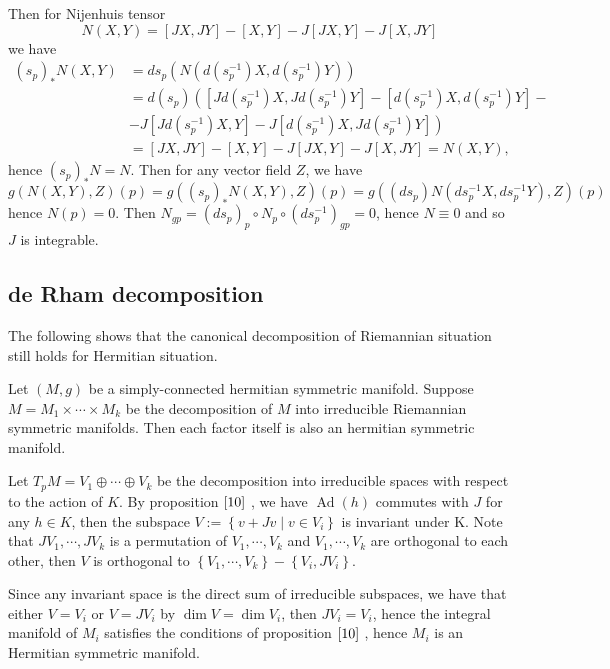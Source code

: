Then for Nijenhuis tensor
\[
N(X, Y)=[J X, J Y]-[X, Y]-J[J X, Y]-J[X, J Y]
\]
we have
\[
\begin{aligned}
	\left(s_{p}\right)_{*} N(X, Y) &=d
	s_{p}\left(N\left(d\left(s_{p}^{-1}\right) X,
	d\left(s_{p}^{-1}\right) Y\right)\right) \\
	&=d\left(s_{p}\right)\left(\left[J d\left(s_{p}^{-1}\right)
	X, J d\left(s_{p}^{-1}\right)
	Y\right]-\left[d\left(s_{p}^{-1}\right) X,
	d\left(s_{p}^{-1}\right) Y\right]-\right.\\
	&\left.-J\left[J d\left(s_{p}^{-1}\right) X,
	Y\right]-J\left[d\left(s_{p}^{-1}\right) X, J
	d\left(s_{p}^{-1}\right) Y\right]\right) \\
	&=[J X, J Y]-[X, Y]-J[J X, Y]-J[X, J Y]=N(X, Y),
\end{aligned}
\]
hence $\left(s_{p}\right)_{*} N=N$. Then for any vector field
$Z$, we have
\[
g(N(X, Y), Z)(p)=g\left(\left(s_{p}\right)_{*} N(X, Y),
Z\right)(p)=g\left(\left(d s_{p}\right) N\left(d s_{p}^{-1} X, d
s_{p}^{-1} Y\right), Z\right)(p)
\]
hence $N(p)=0$. Then $N_{g p}=\left(d s_{p}\right)_{p} \circ
N_{p} \circ\left(d s_{p}^{-1}\right)_{g p}=0$, hence $N \equiv 0$
and so $J$ is integrable.
\eproof
\subsection{de Rham decomposition}

The following shows that the canonical decomposition of
Riemannian situation still holds for Hermitian situation.

\begin{theorem}
Let $(M, g)$ be a simply-connected hermitian symmetric manifold.
Suppose $M=M_{1} \times \cdots \times M_{k}$ be the decomposition
of $M$ into irreducible Riemannian symmetric manifolds. Then each
factor itself is also an hermitian symmetric manifold.	
\end{theorem}
\bproof
Let $T_{p} M=V_{1} \oplus \cdots \oplus V_{k}$ be the
decomposition into irreducible spaces with respect to the action
of $K$. By proposition $\ref{10}$ , we have
$\operatorname{Ad}(h)$ commutes with $J$ for any $h \in K$, then
the subspace $V:=\left\{v+J v \mid v \in V_{i}\right\}$ is
invariant under
K. Note that $J V_{1}, \cdots, J V_{k}$ is a permutation of
$V_{1}, \cdots, V_{k}$ and $V_{1}, \cdots, V_{k}$ are orthogonal
to each other, then $V$ is orthogonal to $\left\{V_{1}, \cdots,
V_{k}\right\}-\left\{V_{i}, J V_{i}\right\}$.

Since any invariant space is the direct sum of irreducible
subspaces, we have that either $V=V_{i}$ or $V=J V_{i}$ by
$\operatorname{dim} V=\operatorname{dim} V_{i}$, then $J
V_{i}=V_{i}$, hence the integral manifold of $M_{i}$ satisfies
the conditions of proposition $\ref{10}$ , hence $M_{i}$ is
an Hermitian symmetric manifold.
\eproof


